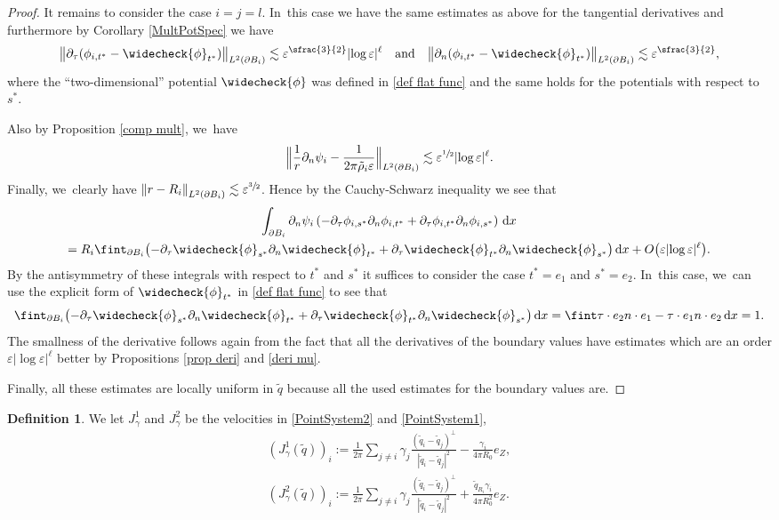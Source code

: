 \documentclass[10pt]{amsart}
\let\strokedint\fint
\let\epsilon\varepsilon
\theoremstyle{definition}
\newtheorem{definition}[theorem]{Definition}
\newcommand\norm[1]{\left\lVert #1\right\rVert}
\newcommand\bnorm[1]{\bigl\lVert #1\bigr\rVert}
\newcommand\Bnorm[1]{\Bigl\lVert #1\Bigr\rVert}
\newcommand\eq{=}
\newcommand\dd{\,\mathrm{d}}
\newcommand\dx{\dd x}
\let\chek\widecheck
\let\de\partial
\let\eps\epsilon
\begin{document}
\begin{proof}
It remains to consider the case $i=j=l$. In~this case we have the same estimates as above for the tangential derivatives and furthermore by Corollary \ref{MultPotSpec} we have
\begin{align*}
\bnorm{\de_\tau(\phi_{i,t^*}-\chek{\phi}_{t^*})}_{L^2(\de B_i)}\lesssim \eps^{\sfrac{3}{2}}|{\log\eps}|^\ell\quad\text{and}\quad \bnorm{\de_n(\phi_{i,t^*}-\chek{\phi}_{t^*})}_{L^2(\de B_i)}\lesssim \eps^{\sfrac{3}{2}},
\end{align*}
where the ``two-dimensional'' potential $\chek{\phi}$ was defined in \ref{def flat func} and the same holds for the potentials with respect to $s^*$.

Also by Proposition \ref{comp mult}, we~have
\begin{align*}
\Bnorm{\frac{1}{r}\de_n\psi_i-\frac{1}{2\pi\tilde{\rho}_i\eps}}_{L^2(\de B_i)}\lesssim \eps^{\sfrac{1}{2}}|{\log\eps}|^\ell.
\end{align*}
Finally, we~clearly have $\norm{r-R_i}_{L^2(\de B_i)}\lesssim \eps^{\sfrac{3}{2}}$. Hence by the Cauchy-Schwarz inequality we see that
\begin{multline*}
\int_{\de B_i}\de_n\psi_i\left(-\de_\tau\phi_{i,s^*}\de_n\phi_{i,t^*}+\de_\tau\phi_{i,t^*}\de_n\phi_{i,s^*}\right)\dx\notag\\
\eq R_i\strokedint_{\de B_i}\bigl(-\de_\tau\chek{\phi}_{s^*}\de_n\chek{\phi}_{t^*}+\de_\tau\chek{\phi}_{t^*}\de_n\chek{\phi}_{s^*}\bigr)\dx+O\bigl(\eps|{\log\eps}|^\ell\bigr).
\end{multline*}
By the antisymmetry of these integrals with respect to $t^*$ and $s^*$ it suffices to consider the case $t^*=e_1$ and $s^*=e_2$. In~this case, we~can use the explicit form of $\chek{\phi}_{t^*}$ in \ref{def flat func} to see that
\begin{align*}
\strokedint_{\de B_i} \bigl(-\de_\tau\chek{\phi}_{s^*}\de_n\chek{\phi}_{t^*}+\de_\tau\chek{\phi}_{t^*}\de_n\chek{\phi}_{s^*} \bigr)\dx\eq \strokedint \tau\cdot e_2n\cdot e_1-\tau\cdot e_1n\cdot e_2\dx\eq 1.
\end{align*}
The smallness of the derivative follows again from the fact that all the derivatives of the boundary values have estimates which are an order $\eps|{\log\eps}|^\ell$ better by Propositions \ref{prop deri} and \ref{deri mu}.

Finally, all these estimates are locally uniform in $\tilde{q}$ because all the used estimates for the boundary values are.\end{proof}

\begin{definition}\label{def J}
We let $J_\gamma^1$ and $J_\gamma^2$ be the velocities in \eqref{PointSystem2} and \eqref{PointSystem1}, \ie
\begin{align*}
(J_\gamma^1(\tilde{q}))_i:= \frac{1}{2\pi}\sum_{j\neq i}\gamma_j\frac{(\tilde{q}_i-\tilde{q}_j)^\perp}{|\tilde{q}_i-\tilde{q}_j|^2}-\frac{\gamma_i}{4\pi R_0}e_Z,\\
(J_\gamma^2(\tilde{q}))_i:= \frac{1}{2\pi}\sum_{j\neq i}\gamma_j\frac{(\tilde{q}_i-\tilde{q}_j)^\perp}{|\tilde{q}_i-\tilde{q}_j|^2}+\frac{\tilde{q}_{R_i}\gamma_i}{4\pi R_0^2}e_Z.
\end{align*}
\end{definition}
\end{document}
